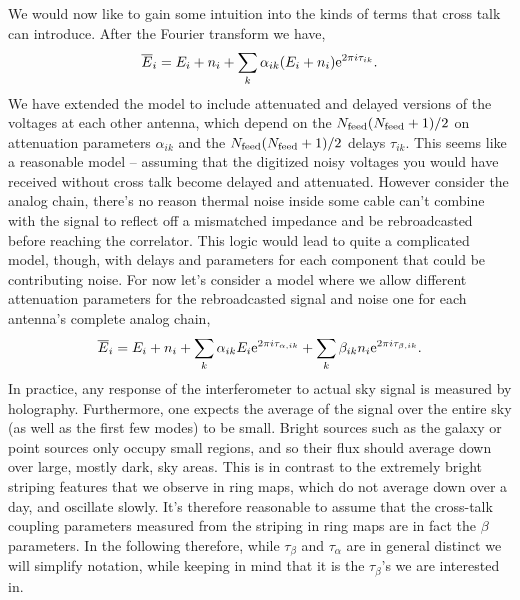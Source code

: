 We would now like to gain some intuition into the kinds of terms that cross talk can introduce. After the Fourier transform we have,
\begin{equation}
\overline{E}_i = E_i + n_i + \sum_{k} \alpha_{ik} (E_i + n_i) {\rm e}^{2\pi i \tau_{ik}}. \label{pre-xtalkmodel}
\end{equation}
We have extended the model to include attenuated and delayed versions of the voltages at each other antenna, which depend on the $N_{\rm feed}(N_{\rm feed} + 1)/2$ on attenuation parameters $\alpha_{ik}$ and the $N_{\rm feed}(N_{\rm feed} + 1)/2$ delays $\tau_{ik}$. This seems like a reasonable model -- assuming that the digitized noisy voltages you would have received without cross talk become delayed and attenuated. However consider the analog chain, there's no reason thermal noise inside some cable can't combine with the signal to reflect off a mismatched impedance and be rebroadcasted before reaching the correlator. This logic would lead to quite a complicated model, though, with delays and parameters for each component that could be contributing noise. For now let's consider a model where we allow different attenuation parameters for the rebroadcasted signal and noise one for each antenna's complete analog chain,
\begin{align}
\overline{E}_i = E_i + n_i + \sum_{k} \alpha_{ik} E_i {\rm e}^{2\pi i \tau_{\alpha,ik}} + \sum_{k} \beta_{ik} n_i {\rm e}^{2\pi i \tau_{\beta,ik}}. \label{xtalkmodel}
\end{align}
In practice, any response of the interferometer to actual sky signal is measured by holography. Furthermore, one expects the average of the signal over the entire sky (as well as the first few modes) to be small. Bright sources such as the galaxy or point sources only occupy small regions, and so their flux should average down over large, mostly dark, sky areas. This is in contrast to the extremely bright striping features that we observe in ring maps, which do not average down over a day, and oscillate slowly. It's therefore reasonable to assume that the cross-talk coupling parameters measured from the striping in ring maps are in fact the $\beta$ parameters. In the following therefore, while $\tau_\beta$ and $\tau_\alpha$ are in general distinct we will simplify notation, while keeping in mind that it is the $\tau_\beta$'s we are interested in.

